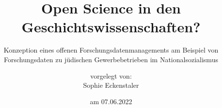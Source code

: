 \titlehead{Humboldt-Universität zu Berlin\\
Philosophische Fakultät\\
Institut für Geschichtswissenschaften\vspace*{4cm}}
\subject{Masterarbeit}
\title{Open Science in den Geschichtswissenschaften?}
\subtitle{Konzeption eines offenen Forschungsdatenmanagements am Beispiel von Forschungsdaten zu jüdischen Gewerbebetrieben im Nationalsozialismus}
\author{vorgelegt von:\\Sophie Eckenstaler}
\date{am 07.06.2022\vspace*{3.7cm}}
\publishers{\normalsize
Erstbetreuer: Prof. Dr. Rüdiger Hohls, Institut für Geschichtswissenschaften, HU Berlin\\ 
Zweitbetreuer: Prof. Dr. Michael Wildt, Institut für Geschichtswissenschaften, HU Berlin\\
Studiengang: Master of Arts, Geschichtswissenschaften, Schwerpunkt: Digital History\\
Matrikelnr.: 596272\\
E-Mail: sophie.eckenstaler@hu-berlin.de\\
Eberswalde, den 7. Juni 2022
}


